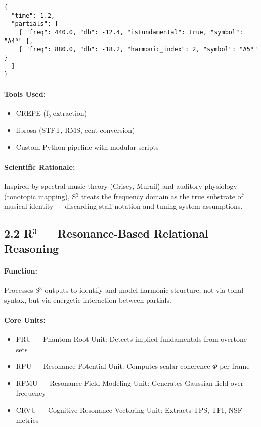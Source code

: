 \documentclass[10pt]{article}
\begin{document}
\begin{verbatim}
{
  "time": 1.2,
  "partials": [
    { "freq": 440.0, "db": -12.4, "isFundamental": true, "symbol": "A4⁰" },
    { "freq": 880.0, "db": -18.2, "harmonic_index": 2, "symbol": "A5⁰" }
  ]
}
\end{verbatim}

\paragraph{Tools Used:}

\begin{itemize}
  \item CREPE (f₀ extraction)
  \item librosa (STFT, RMS, cent conversion)
  \item Custom Python pipeline with modular scripts
\end{itemize}

\paragraph{Scientific Rationale:}  
Inspired by spectral music theory (Grisey, Murail) and auditory physiology (tonotopic mapping), S$^{3}$ treats the frequency domain as the true substrate of musical identity — discarding staff notation and tuning system assumptions.

\subsection*{2.2 R$^{3}$ — Resonance-Based Relational Reasoning}

\paragraph{Function:}  
Processes S$^{3}$ outputs to identify and model harmonic structure, not via tonal syntax, but via energetic interaction between partials.

\paragraph{Core Units:}

\begin{itemize}
  \item PRU — Phantom Root Unit: Detects implied fundamentals from overtone sets
  \item RPU — Resonance Potential Unit: Computes scalar coherence $\Phi$ per frame
  \item RFMU — Resonance Field Modeling Unit: Generates Gaussian field over frequency
  \item CRVU — Cognitive Resonance Vectoring Unit: Extracts TPS, TFI, NSF metrics
\end{itemize}
\end{document}
